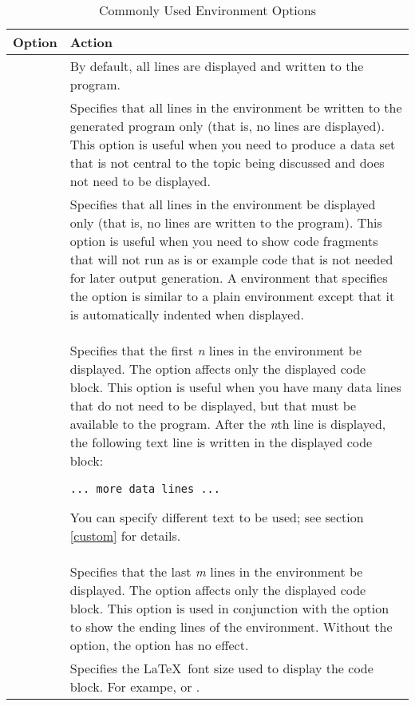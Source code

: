 \documentclass[article,oneside]{memoir}
\begin{document}
\begin{table}[H]
\caption{Commonly Used  Environment Options}\label{dsopt}
\begin{tabular}{lP{3.75in}}
\hline
\textbf{Option}  &  \textbf{Action} \\
\hline
                    & By default, all lines are displayed and written to the program. 
\\[0.5\baselineskip]
      & 
                 Specifies that all lines in the environment
                 be written to the generated program only
                (that is, no lines are displayed). This option is useful when you need
                to produce a data set that is not central to the topic being
                discussed and does not need to be displayed.
\\[0.5\baselineskip]
      &
                Specifies that all lines in the environment be displayed 
                only (that is, no lines are written to the program). This option is
                useful when you need to show code fragments that will not run as is or
                example code that is not needed
                for later output generation. A  environment that specifies
                the  option is similar to a plain  environment except
                that it is automatically indented when displayed. 
\\[0.5\baselineskip]
 & 
               Specifies that the first \textit{n} lines 
               in the environment be displayed. The option affects only the displayed
               code block.
               This option is useful when you have many data lines that do not need to be
               displayed, but that must be available to the program. 
               After the \textit{n}th line is displayed, the following 
               text line is written in the displayed code block: 
               \par\texttt{... more data lines ...}\par%
               You can specify different text to be used; 
               see section \ref{custom} for details.
\\[0.5\baselineskip]
 & 
               Specifies that the last \textit{m} lines 
               in the environment be displayed. The option affects only the displayed
               code block.
               This option is used in conjunction with the  option to show
               the ending lines of the  environment. Without the 
               option, the  option has no effect.
\\[0.5\baselineskip]
   & Specifies the \LaTeX\ font size used to display the
       code block. For exampe,  or .
\\
\hline

\end{tabular}
\end{table}     
\end{document}
